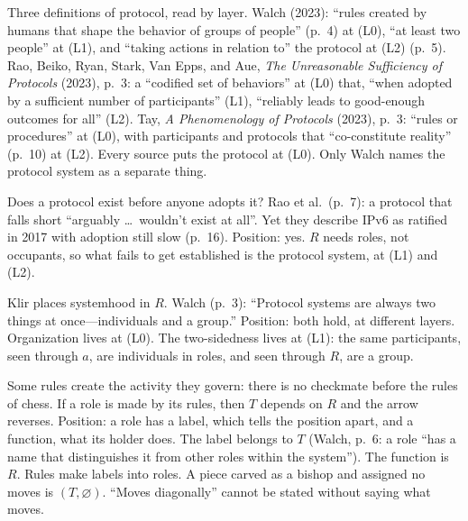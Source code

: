 \begin{remark}
  Three definitions of protocol, read by layer. Walch (2023): ``rules
  created by humans that shape the behavior of groups of people'' (p.~4) at
  (L0), ``at least two people'' at (L1), and ``taking actions in relation
  to'' the protocol at (L2) (p.~5). Rao, Beiko, Ryan, Stark, Van Epps, and
  Aue, \emph{The Unreasonable Sufficiency of Protocols} (2023), p.~3: a
  ``codified set of behaviors'' at (L0) that, ``when adopted by a sufficient
  number of participants'' (L1), ``reliably leads to good-enough outcomes for
  all'' (L2). Tay, \emph{A Phenomenology of Protocols} (2023), p.~3:
  ``rules or procedures'' at (L0), with participants and protocols that
  ``co-constitute reality'' (p.~10) at (L2). Every source puts the protocol
  at (L0). Only Walch names the protocol system as a separate thing.
\end{remark}

\begin{problem}
  \label{prob:unadopted}
  Does a protocol exist before anyone adopts it? Rao et al.\ (p.~7): a
  protocol that falls short ``arguably \ldots\ wouldn't exist at all''. Yet
  they describe IPv6 as ratified in 2017 with adoption still slow (p.~16).
  Position: yes. $R$ needs roles, not occupants, so what fails to get
  established is the protocol system, at (L1) and (L2).
\end{problem}

\begin{problem}
  \label{prob:systemhood}
  Klir places systemhood in $R$. Walch (p.~3): ``Protocol systems are always
  two things at once---individuals and a group.'' Position: both hold, at
  different layers. Organization lives at (L0). The two-sidedness lives at
  (L1): the same participants, seen through $a$, are individuals in roles,
  and seen through $R$, are a group.
\end{problem}

\begin{problem}
  \label{prob:rules-roles}
  Some rules create the activity they govern: there is no checkmate before
  the rules of chess. If a role is made by its rules, then $T$ depends on $R$
  and the arrow reverses. Position: a role has a label, which tells the
  position apart, and a function, what its holder does. The label belongs to
  $T$ (Walch, p.~6: a role ``has a name that distinguishes it from other
  roles within the system''). The function is $R$. Rules make labels into
  roles. A piece carved as a bishop and assigned no moves is $(T,
  \varnothing)$. ``Moves diagonally'' cannot be stated without saying what
  moves.
\end{problem}

